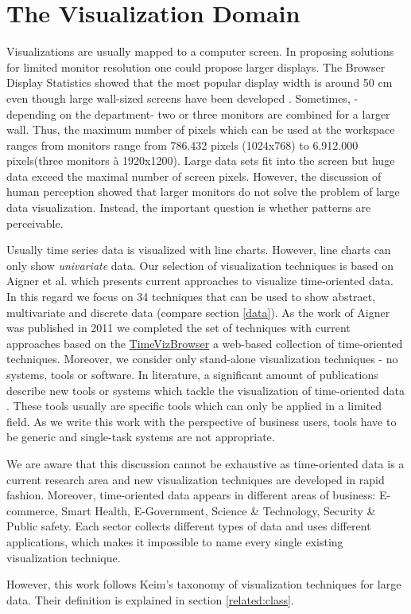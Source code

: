 \section{The Visualization Domain} 
\label{resolution}
Visualizations are usually mapped to a computer screen. In proposing solutions for limited monitor resolution one could propose larger displays. The Browser Display Statistics showed that the most popular display width is around 50 cm even though large wall-sized screens have been developed \cite{W3schools2017}. Sometimes, -depending on the department- two or three monitors are combined for a larger wall. Thus, the maximum number of pixels which can be used at the workspace ranges from monitors range from 786.432 pixels (1024x768) to 6.912.000 pixels(three monitors à 1920x1200). Large data sets fit into the screen but huge data exceed the maximal number of screen pixels. However, the discussion of human perception showed that larger monitors do not solve the problem of large data visualization. Instead, the important question is whether patterns are perceivable.
\par
\label{vis}
Usually time series data is visualized with line charts. However, line charts can only show \textit{univariate} data. Our selection of visualization techniques is based on Aigner et al.  \cite{Aigner2011} which presents current approaches to visualize time-oriented data. In this regard we focus on 34 techniques that can be used to show abstract, multivariate and discrete data (compare section \ref{data}). 
As the work of Aigner was published in 2011 we completed the set of techniques with current approaches based on the \href{http://survey.timeviz.net/}{TimeVizBrowser} a web-based collection of time-oriented techniques. Moreover, we consider only stand-alone visualization techniques - no systems, tools or software. In literature, a significant amount of publications describe new tools or systems which tackle the visualization of time-oriented data \cite{Hochheiser2004,Buono2005}. These tools usually are specific tools which can only be applied in a limited field. As we write this work with the perspective of business users, tools have to be generic and single-task systems are not appropriate.


We are aware that this discussion cannot be exhaustive as time-oriented data is a current research area and new visualization techniques are developed in rapid fashion.
Moreover, time-oriented data appears in different areas of business: E-commerce, Smart Health, E-Government, Science \& Technology, Security \& Public safety. Each sector collects different types of data and uses different applications, which makes it impossible to name every single existing visualization technique.


However, this work follows Keim's taxonomy of visualization techniques for large data. Their definition is explained in section \ref{related:class}.
